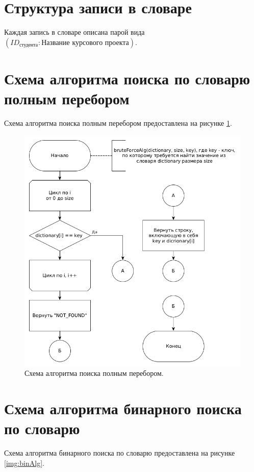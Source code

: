 \documentclass[12pt]{report}
\begin{document}
\section{Структура записи в словаре}
Каждая запись в словаре описана парой вида $(ID_{\textit{студента}} : \textit{Название курсового проекта})$.

\section{Схема алгоритма поиска по словарю полным перебором}
Схема алгоритма поиска полным перебором предоставлена на рисунке \ref{img:brutAlg}.

\begin{figure}
\begin{center}
\includegraphics[scale=0.4]{inc/img/brutAlg.png}
\captionsetup{justification=centering}
	\caption{Схема алгоритма поиска полным перебором.}
	\label{img:brutAlg}	
\end{center}
\end{figure}

\newpage

\section{Схема алгоритма бинарного поиска по словарю}
Схема алгоритма бинарного поиска по словарю предоставлена на рисунке \ref{img:binAlg}.
\end{document}
